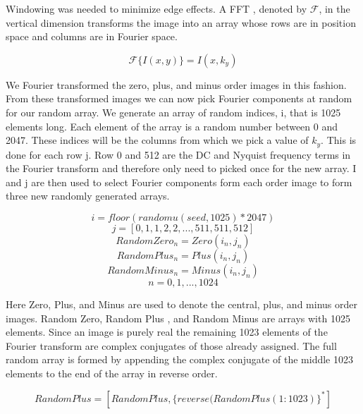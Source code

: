 \documentclass[]{aastex6}
\begin{document}
Windowing was needed to minimize edge effects.  A FFT , denoted by $\mathcal{F}$, in the vertical dimension transforms the image into an array whose rows are in position space and columns are in Fourier space.

\begin{equation}
\mathcal{F}\lbrace I(x,y) \rbrace = I(x,k_y)
\end{equation}

We Fourier transformed the zero, plus, and minus order images in this fashion.  From these transformed images we can now pick Fourier components at random for our random array. We generate an array of random indices, i, that is 1025 elements long.  Each element of the array is a random number between 0 and 2047. These indices will be the columns from which we pick a value of $k_y$.  This is done for each row j. Row 0 and 512 are the DC and Nyquist frequency terms in the Fourier transform and therefore only need to picked once for the new array. I and j are then used to select Fourier components form each order image to form three new randomly generated arrays.

\begin{equation}
i = floor(randomu(seed,1025)*2047)
\end{equation}
\begin{equation}
j = [0,1,1,2,2,..., 511,511,512]
\end{equation}
\begin{equation}
Random Zero_n = Zero(i_n,j_n)  
\end{equation}
\begin{equation*}
Random Plus_n = Plus(i_n,j_n)   
\end{equation*}
\begin{equation*}
Random Minus_n = Minus(i_n,j_n)   
\end{equation*}
\begin{equation*}
n = 0,1,...,1024
\end{equation*}

Here Zero, Plus, and Minus are used to denote the central, plus, and minus order images.  Random Zero, Random Plus , and Random Minus are arrays with 1025 elements. Since an image is purely real the remaining 1023 elements of the Fourier transform are complex conjugates of those already assigned. The full random array is formed by appending the complex conjugate of the middle 1023 elements to the end of the array in reverse order.

\begin{equation}
Random Plus = [Random Plus,\lbrace reverse(Random Plus(1:1023)\rbrace^*] 
\end{equation}
\end{document}
